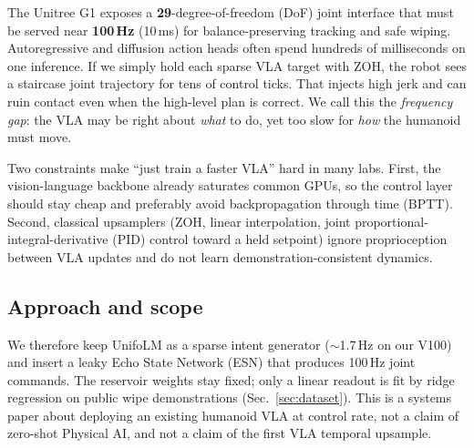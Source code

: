 \documentclass{article}
\begin{document}
The Unitree G1 exposes a \textbf{29}-degree-of-freedom (DoF) joint interface that must be served near \textbf{100\,Hz} (10\,ms) for balance-preserving tracking and safe wiping.
Autoregressive and diffusion action heads often spend hundreds of milliseconds on one inference.
If we simply hold each sparse VLA target with ZOH, the robot sees a staircase joint trajectory for tens of control ticks.
That injects high jerk and can ruin contact even when the high-level plan is correct.
We call this the \emph{frequency gap}: the VLA may be right about \emph{what} to do, yet too slow for \emph{how} the humanoid must move.

Two constraints make ``just train a faster VLA'' hard in many labs.
First, the vision-language backbone already saturates common GPUs, so the control layer should stay cheap and preferably avoid backpropagation through time (BPTT).
Second, classical upsamplers (ZOH, linear interpolation, joint proportional-integral-derivative (PID) control toward a held setpoint) ignore proprioception between VLA updates and do not learn demonstration-consistent dynamics.

\subsection{Approach and scope}
We therefore keep UnifoLM as a sparse intent generator ($\sim$1.7\,Hz on our V100) and insert a leaky Echo State Network (ESN) that produces 100\,Hz joint commands.
The reservoir weights stay fixed; only a linear readout is fit by ridge regression on public wipe demonstrations (Sec.~\ref{sec:dataset}).
This is a systems paper about deploying an existing humanoid VLA at control rate, not a claim of zero-shot Physical AI, and not a claim of the first VLA temporal upsample.
\end{document}
